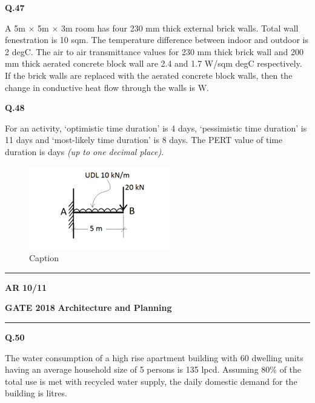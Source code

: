 \documentclass{article}
\begin{document}
\vspace{0.3cm}
\noindent
\textbf{Q.47} \hspace{0.5cm} \parbox[t]{14.39959cm}{ A 5m $\times$ 5m $\times$ 3m room has four 230 mm thick external brick walls. Total wall fenestration is 10 sqm. The temperature difference between indoor and outdoor is 2 degC. The air to air transmittance values for 230 mm thick brick wall and 200 mm thick aerated concrete block wall are 2.4 and 1.7 W/sqm degC respectively. If the brick walls are replaced with the aerated concrete block walls, then the change in conductive heat flow through the walls is \underline{\hspace{3cm}} W.}

\vspace{01cm}

\noindent
\textbf{Q.48}\hspace{0.5cm} \parbox[t]{14.5cm}{ For an activity, ‘optimistic time duration’ is 4 days, ‘pessimistic time duration’ is 11 days and ‘most-likely time duration’ is 8 days. The PERT value of time duration is \underline{\hspace{2cm}} days \emph{(up to one decimal place)}.}

\begin{figure}[h]
    \centering
    \includegraphics[width=0.4\linewidth]{Figs/Screenshot 2025-08-16 133516.png}
    \caption{Caption}
    \label{fig:placeholder}
\end{figure}

\vspace{0.5cm}
 \noindent
\hrule \vspace{0.0875CM} \textbf{AR} \hfill  \textbf{10/11}

\newpage
\noindent
\textbf{GATE 2018} \hfill \textbf{Architecture and Planning}
\vspace{0.0012cm} \hrule
\vspace{1cm}


\noindent
\textbf{Q.50}\hspace{0.5cm} \parbox[t]{14.5cm}{ The water consumption of a high rise apartment building with 60 dwelling units having an average household size of 5 persons is 135 lpcd. Assuming 80\% of the total use is met with recycled water supply, the daily domestic demand for the building is \underline{\hspace{3cm}} litres.}
\end{document}
